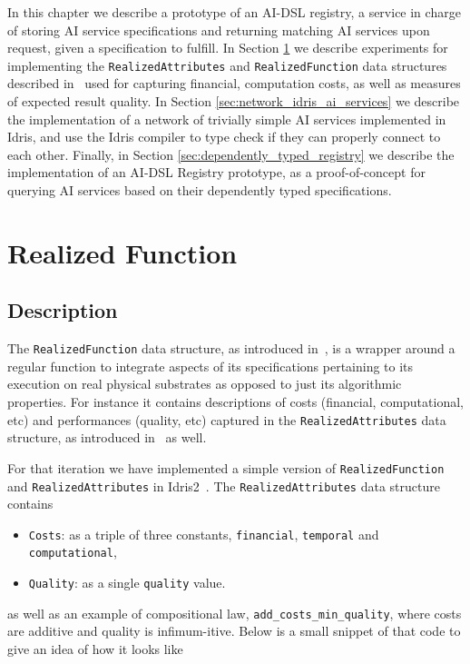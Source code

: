 \documentclass[]{report}
\begin{document}
In this chapter we describe a prototype of an AI-DSL registry, a
service in charge of storing AI service specifications and returning
matching AI services upon request, given a specification to fulfill.
In Section \ref{sec:realized_function} we describe experiments for
implementing the \texttt{RealizedAttributes} and
\texttt{RealizedFunction} data structures described
in~\cite{GoertzelGeisweillerBlog} used for capturing financial,
computation costs, as well as measures of expected result quality.  In
Section \ref{sec:network_idris_ai_services} we describe the implementation
of a network of trivially simple AI services implemented in Idris, and
use the Idris compiler to type check if they can properly connect to each
other.  Finally, in Section \ref{sec:dependently_typed_registry} we describe the
implementation of an AI-DSL Registry prototype, as a proof-of-concept
for querying AI services based on their dependently typed
specifications.

\section{Realized Function}
\label{sec:realized_function}

\subsection{Description}

The \texttt{RealizedFunction} data structure, as introduced
in~\cite{GoertzelGeisweillerBlog}, is a wrapper around a regular
function to integrate aspects of its specifications pertaining to its
execution on real physical substrates as opposed to just its
algorithmic properties.  For instance it contains descriptions of
costs (financial, computational, etc) and performances (quality, etc)
captured in the \texttt{RealizedAttributes} data structure, as
introduced in~\cite{GoertzelGeisweillerBlog} as well.

For that iteration we have implemented a simple version of
\texttt{RealizedFunction} and \texttt{RealizedAttributes} in
Idris2~\cite{Idris}.  The \texttt{RealizedAttributes} data structure
contains
\begin{itemize}
\item \texttt{Costs}: as a triple of three constants,
  \texttt{financial}, \texttt{temporal} and \texttt{computational},
\item \texttt{Quality}: as a single \texttt{quality} value.
\end{itemize}
as well as an example of compositional law,
\texttt{add\_costs\_min\_quality}, where costs are additive and
quality is infimum-itive.  Below is a small snippet of that code to
give an idea of how it looks like
\end{document}
